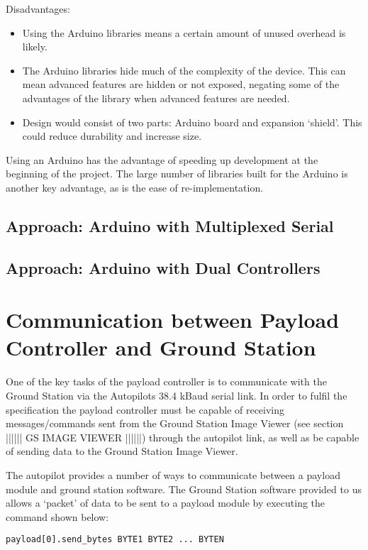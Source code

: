 Disadvantages:
\begin{itemize}
\item Using the Arduino libraries means a certain amount of unused overhead is likely.

\item The Arduino libraries hide much of the complexity of the device. This can mean advanced features are hidden or not exposed, negating some of the advantages of the library when advanced features are needed.

\item Design would consist of two parts: Arduino board and expansion `shield'. This could reduce durability and increase size.
\end{itemize}

Using an Arduino has the advantage of speeding up development at the beginning of the project. The large number of libraries built for the Arduino is another key advantage, as is the ease of re-implementation.

\subsection{Approach: Arduino with Multiplexed Serial}

\subsection{Approach: Arduino with Dual Controllers}

\section{Communication between Payload Controller and Ground Station}
One of the key tasks of the payload controller is to communicate with the Ground Station via the Autopilots 38.4 kBaud serial link. In order to fulfil the specification the payload controller must be capable of receiving messages/commands sent from the Ground Station Image Viewer (see section |||||| GS IMAGE VIEWER ||||||) through the autopilot link, as well as be capable of sending data to the Ground Station Image Viewer.

The autopilot provides a number of ways to communicate between a payload module and ground station software. The Ground Station software provided to us allows a `packet' of data to be sent to a payload module by executing the command shown below:
~\\
\begin{lstlisting}[caption={Sending bytes 1 to N from ground station to payload module}, label=lst:ground_station_send_bytes]
payload[0].send_bytes BYTE1 BYTE2 ... BYTEN 
\end{lstlisting} 

